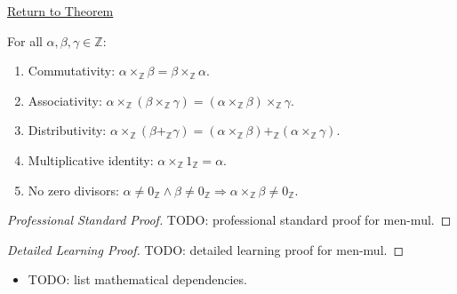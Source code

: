 \newpage
{}
\label{prf:men-mul}

\begin{remark*}[Return]
\hyperref[thm:men-mul]{Return to Theorem}
\end{remark*}

\begin{theorem*}
For all $\alpha, \beta, \gamma \in \mathbb{Z}$:
\begin{enumerate}
  \item[(i)] Commutativity: $\alpha \times_{\mathbb{Z}} \beta
    = \beta \times_{\mathbb{Z}} \alpha$.
  \item[(ii)] Associativity: $\alpha \times_{\mathbb{Z}}
    (\beta \times_{\mathbb{Z}} \gamma)
    = (\alpha \times_{\mathbb{Z}} \beta) \times_{\mathbb{Z}} \gamma$.
  \item[(iii)] Distributivity: $\alpha \times_{\mathbb{Z}}
    (\beta +_{\mathbb{Z}} \gamma)
    = (\alpha \times_{\mathbb{Z}} \beta)
    +_{\mathbb{Z}} (\alpha \times_{\mathbb{Z}} \gamma)$.
  \item[(iv)] Multiplicative identity: $\alpha \times_{\mathbb{Z}}
    1_{\mathbb{Z}} = \alpha$.
  \item[(v)] No zero divisors: $\alpha \neq 0_{\mathbb{Z}} \wedge
    \beta \neq 0_{\mathbb{Z}} \Rightarrow
    \alpha \times_{\mathbb{Z}} \beta \neq 0_{\mathbb{Z}}$.
\end{enumerate}
\end{theorem*}

\begin{proof}[Professional Standard Proof]
\LRAProofBodyStart
TODO: professional standard proof for men-mul.
\end{proof}

\begin{proof}[Detailed Learning Proof]
\LRAProofBodyStart
TODO: detailed learning proof for men-mul.
\end{proof}

\begin{remark*}
\end{remark*}

\begin{dependencies}
\begin{itemize}
  \item TODO: list mathematical dependencies.
\end{itemize}
\end{dependencies}

\clearpage
